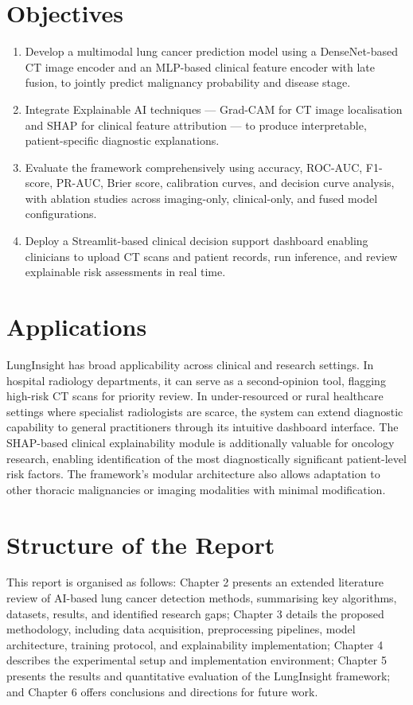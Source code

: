 {\section{Objectives}
\begin{enumerate}
    \item Develop a multimodal lung cancer prediction model using a DenseNet-based CT image encoder and an MLP-based clinical feature encoder with late fusion, to jointly predict malignancy probability and disease stage.
    \item Integrate Explainable AI techniques — Grad-CAM for CT image localisation and SHAP for clinical feature attribution — to produce interpretable, patient-specific diagnostic explanations.
    \item Evaluate the framework comprehensively using accuracy, ROC-AUC, F1-score, PR-AUC, Brier score, calibration curves, and decision curve analysis, with ablation studies across imaging-only, clinical-only, and fused model configurations.
    \item Deploy a Streamlit-based clinical decision support dashboard enabling clinicians to upload CT scans and patient records, run inference, and review explainable risk assessments in real time.
\end{enumerate}

\section{Applications}
LungInsight has broad applicability across clinical and research settings. In hospital radiology departments, it can serve as a second-opinion tool, flagging high-risk CT scans for priority review. In under-resourced or rural healthcare settings where specialist radiologists are scarce, the system can extend diagnostic capability to general practitioners through its intuitive dashboard interface. The SHAP-based clinical explainability module is additionally valuable for oncology research, enabling identification of the most diagnostically significant patient-level risk factors. The framework's modular architecture also allows adaptation to other thoracic malignancies or imaging modalities with minimal modification.

\section{Structure of the Report}
This report is organised as follows: Chapter 2 presents an extended literature review of AI-based lung cancer detection methods, summarising key algorithms, datasets, results, and identified research gaps; Chapter 3 details the proposed methodology, including data acquisition, preprocessing pipelines, model architecture, training protocol, and explainability implementation; Chapter 4 describes the experimental setup and implementation environment; Chapter 5 presents the results and quantitative evaluation of the LungInsight framework; and Chapter 6 offers conclusions and directions for future work.

}
